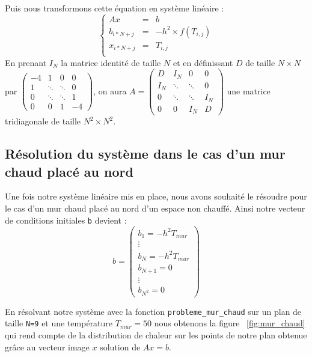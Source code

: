 \documentclass{article}
\begin{document}
Puis nous transformons cette équation en système linéaire :
\[ \left\{
\begin{array}{rcr}
  
  Ax & = & b \\
  b_{i*N+j} & = & -h^{2}\times f(T_{i,j}) \\
  x_{i*N+j} & = & T_{i,j} \\
\end{array}
\right.\]
En prenant $I_{N}$ la matrice identité de taille $N$ et en définissant $D$ de taille $N\times N$ par $\begin{pmatrix} -4 & 1 & 0 & 0 \\ 1 & \ddots & \ddots & 0 \\ 0 & \ddots & \ddots & 1  \\ 0  & 0 & 1 & -4 \end{pmatrix} $, on aura $A = \begin{pmatrix}  D & I_{N} & 0 & 0 \\ I_{N} & \ddots & \ddots & 0 \\ 0 & \ddots & \ddots & I_{N}  \\ 0  & 0 & I_{N} & D \end{pmatrix} $ une matrice tridiagonale de taille $N^{2}\times N^{2}$.




\subsection{Résolution du système dans le cas d'un mur chaud placé au nord}


Une fois notre système linéaire mis en place, nous avons souhaité le résoudre pour le cas d'un mur chaud placé au nord d'un espace non chauffé. Ainsi notre vecteur de conditions initiales \texttt{b}  devient :
\begin{equation}\displaystyle{
  b=\begin{pmatrix} b_{1} = -h^{2}T_{mur} \\ \vdots \\ b_{N} = -h^{2}T_{mur} \\
  b_{N+1} = 0 \\ \vdots \\ b_{N^{2}} = 0 \end{pmatrix}}
\end{equation}

En résolvant notre système avec la fonction \texttt{probleme\_mur\_chaud} sur un plan de taille \texttt{N=9} et une température \texttt{$T_{mur}=50$} nous obtenons la figure ~\ref{fig:mur_chaud} qui rend compte de la distribution de chaleur sur les points de notre plan obtenue grâce au vecteur image $x$ solution de $Ax=b$.
\end{document}
